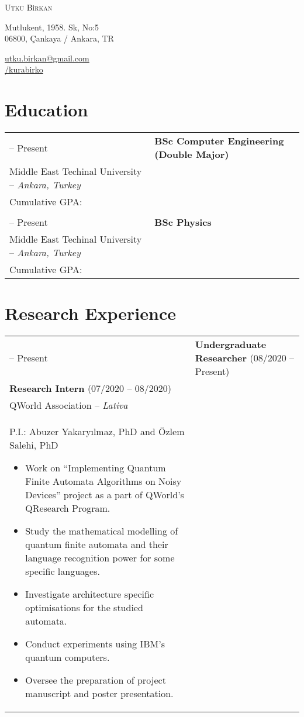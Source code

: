 \documentclass[11pt]{article} %
\makeatletter
\newlength{\firstColumnWidth}
\newlength{\tabusep}
\newlength{\slashSize}
\newcommand{\GitHub}{\raisebox{-0.22ex}{\fontsize{1.5\slashSize}{1.44\slashSize}\ttfamily\faIcon{github}}}
\newcommand{\Tr}[1]{\textturkish{#1}}
\newcommand{\tnl}{\tabularnewline & \tabularnewline}
\newcommand\liningnumbers{\addfontfeature{Numbers=Lining}}
\newenvironment{twocols}
    {
    \begin{longtable}[h]{%
        @{}%
        >{\raggedleft}p{\firstColumnWidth}%
        @{\hspace{\tabusep}}%
        >{\arraybackslash\raggedright}p{\dimexpr %
            \linewidth-\firstColumnWidth-\tabusep%
        \relax}%
        @{}%
        }
    } {
        \end{longtable}
    }
\makeatother
\begin{document}
\begin{center}
	\Tr{\Huge \scshape {Utku Birkan}} \medskip \par
    Mutlukent, 1958. Sk, No:5 \\
    06800, Çankaya / Ankara, TR  \par
	\href{mailto:utku.birkan@gmail.com}{\ttfamily utku.birkan@gmail.com}\\
    \href{https://github.com/kurabirko}{\ttfamily {\GitHub}/kurabirko}\par
\end{center}

\section{Education}

\begin{twocols}
    2018 -- Present & %
        \textbf{BSc Computer Engineering (Double Major)} \\
        Middle East Techinal University -- \textit{Ankara, Turkey} \\
        Cumulative GPA: \liningnumbers{3.77} \tnl
    2017 -- Present & %
            \textbf{BSc Physics} \\
            Middle East Techinal University -- \textit{Ankara, Turkey} \\
            Cumulative GPA: \liningnumbers{3.48}
\end{twocols}

\section{Research Experience}

\begin{twocols}
 2020 -- Present & 
        \textbf{Undergraduate Researcher} (08\kern1pt/2020 -- Present)\\
        \textbf{Research Intern} (07\kern1pt/2020 -- 08\kern1pt/2020)\\
        QWorld Association -- \textit{Lativa}\\
        P.I.: Abuzer Yakaryılmaz, PhD and Özlem Salehi, PhD
        \begin{itemize}
            \item Work on ``Implementing Quantum Finite Automata Algorithms on Noisy Devices'' project as a part of QWorld's QResearch Program.
            \item Study the mathematical modelling of quantum finite automata and their language recognition power for some specific languages.
            \item Investigate architecture specific optimisations for the studied automata.
            \item Conduct experiments using IBM's quantum computers.
            \item Oversee the preparation of project manuscript and poster presentation.
        \end{itemize}
\end{twocols}
\end{document}
